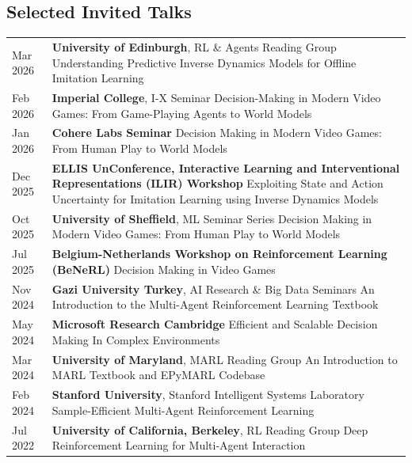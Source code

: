 \documentclass[a4paper,12pt]{article}
\begin{document}
\subsection{Selected Invited Talks}
\begin{expblock}[\linewidth]
    \begin{tabularx}{\linewidth}{@{}l X@{}}
	Mar 2026 & \textbf{University of Edinburgh}, RL \& Agents Reading Group \newline Understanding Predictive Inverse Dynamics Models for Offline Imitation Learning\\
	Feb 2026 & \textbf{Imperial College}, I-X Seminar \newline Decision-Making in Modern Video Games: From Game-Playing Agents to World Models\\
	Jan 2026 & \textbf{Cohere Labs Seminar} \newline Decision Making in Modern Video Games: From Human Play to World Models \\
	Dec 2025 & \textbf{ELLIS UnConference, Interactive Learning and Interventional Representations (ILIR) Workshop} \newline Exploiting State and Action Uncertainty for Imitation Learning using Inverse Dynamics Models \\
	Oct 2025 & \textbf{University of Sheffield}, ML Seminar Series \newline Decision Making in Modern Video Games: From Human Play to World Models \\
	Jul 2025 & \textbf{Belgium-Netherlands Workshop on Reinforcement Learning (BeNeRL)} \newline Decision Making in Video Games \\
	Nov 2024 & \textbf{Gazi University Turkey}, AI Research \& Big Data Seminars \newline An Introduction to the Multi-Agent Reinforcement Learning Textbook \\
	May 2024 & \textbf{Microsoft Research Cambridge} \newline Efficient and Scalable Decision Making In Complex Environments \\
	Mar 2024 & \textbf{University of Maryland}, MARL Reading Group \newline An Introduction to MARL Textbook and EPyMARL Codebase \\
	Feb 2024 & \textbf{Stanford University}, Stanford Intelligent Systems Laboratory \newline Sample-Efficient Multi-Agent Reinforcement Learning \\
	Jul 2022 & \textbf{University of California, Berkeley}, RL Reading Group \newline Deep Reinforcement Learning for Multi-Agent Interaction \\
    \end{tabularx}
\end{expblock}
\end{document}
